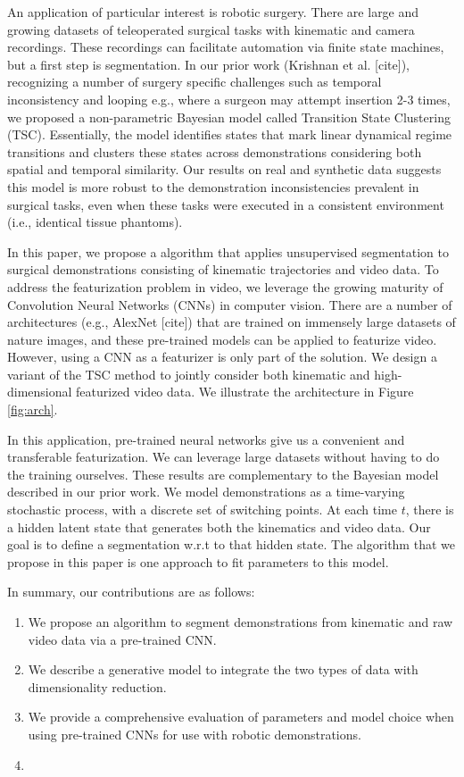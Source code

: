 An application of particular interest is robotic surgery.
There are large and growing datasets of teleoperated surgical tasks with kinematic and camera recordings.
These recordings can facilitate automation via finite state machines, but a first step is segmentation.
In our prior work (Krishnan et al. [cite]), recognizing a number of surgery specific challenges such as temporal inconsistency and looping e.g., where a surgeon may attempt insertion 2-3 times, we proposed a non-parametric Bayesian model called Transition State Clustering (TSC).
Essentially, the model identifies states that mark linear dynamical regime transitions and clusters these states across demonstrations considering both spatial and temporal similarity.
Our results on real and synthetic data suggests this model is more robust to the demonstration inconsistencies prevalent in surgical tasks, even when these tasks were executed in a consistent environment (i.e., identical tissue phantoms). 

In this paper, we propose a  algorithm that applies unsupervised segmentation to surgical demonstrations consisting of kinematic trajectories and video data.
To address the featurization problem in video, we leverage the growing maturity of Convolution Neural Networks (CNNs) in computer vision.
There are a number of architectures  (e.g., AlexNet [cite]) that are trained on immensely large datasets of nature images, and these pre-trained models can be applied to featurize video.
However, using a CNN as a featurizer is only part of the solution.
We design a variant of the TSC method to jointly consider both kinematic and high-dimensional featurized video data.
We illustrate the architecture in Figure \ref{fig:arch}.

In this application, pre-trained neural networks give us a convenient and transferable featurization.
We can leverage large datasets without having to do the training ourselves.
These results are complementary to the Bayesian model described in our prior work.
We model demonstrations as a time-varying stochastic process, with a discrete set of switching points.
At each time $t$, there is a hidden latent state that generates both the kinematics and video data.
Our goal is to define a segmentation w.r.t to that hidden state.
The algorithm that we propose in this paper is one approach to fit parameters to this model.


In summary, our contributions are as follows:
\begin{enumerate}
\item We propose an algorithm to segment demonstrations from kinematic and raw video data via a pre-trained CNN.
\item We describe a generative model to integrate the two types of data with dimensionality reduction.
\item We provide a comprehensive evaluation of parameters and model choice when using pre-trained CNNs for use with robotic demonstrations.
\item {}
\end{enumerate}

